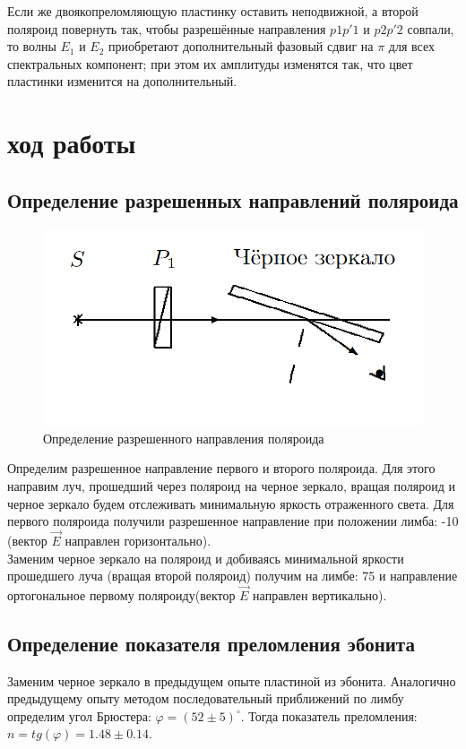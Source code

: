 \documentclass[a4paper, 12pt]{article}%
\begin{document}
	Если же двоякопреломляющую пластинку оставить неподвижной, а
	второй поляроид повернуть так, чтобы разрешённые направления $ p1p'1 $
	и $ p2p'2 $ совпали, то волны $ E_1 $ и $ E_2 $ приобретают дополнительный фазовый сдвиг на $ \pi $ для всех спектральных компонент; при этом их амплитуды изменятся так, что цвет пластинки изменится на дополнительный. 
	\section{ход работы}
	\subsection{Определение разрешенных направлений поляроида}
	\begin{figure}
		\includegraphics[width=\linewidth]{5}
		\caption{Определение разрешенного направления поляроида}
		\label{ris 5}
	\end{figure}
	Определим разрешенное направление первого и второго поляроида. Для этого направим луч, прошедший через поляроид на черное зеркало, вращая поляроид и черное зеркало будем отслеживать минимальную яркость отраженного света.
	Для первого поляроида получили разрешенное направление при положении лимба: -10 (вектор $\vec{E}$ направлен горизонтально).\\
	Заменим черное зеркало на поляроид и добиваясь минимальной яркости прошедшего луча (вращая второй поляроид) получим на лимбе: 75 и направление ортогональное первому поляроиду(вектор $\vec{E}$ направлен вертикально).
	\subsection{Определение показателя преломления эбонита}
	Заменим черное зеркало в предыдущем опыте пластиной из эбонита. Аналогично предыдущему опыту методом последовательный приближений по лимбу определим угол Брюстера: $\varphi = (52\pm 5)^{\circ}$. Тогда показатель преломления: $n = tg(\varphi) = 1.48\pm 0.14$.
\end{document}
